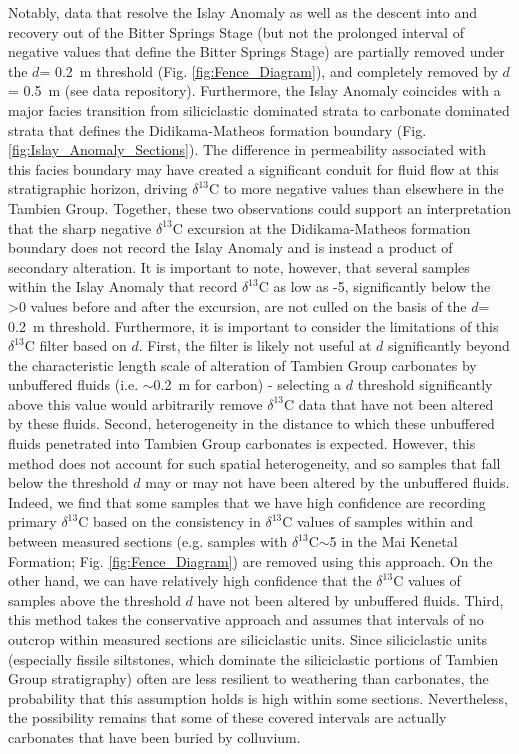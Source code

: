 \documentclass[11pt,letterpaper]{article}
\newcommand{\dC}{$\delta^{13}$C\xspace}
\newcommand{\permil}{\textperthousand\xspace}
\newcommand{\dsil}{$d$\xspace}
\begin{document}
Notably, data that resolve the Islay Anomaly as well as the descent into and recovery out of the Bitter Springs Stage (but not the prolonged interval of negative values that define the Bitter Springs Stage) are partially removed under the \dsil = 0.2~m threshold (Fig. \ref{fig:Fence_Diagram}), and completely removed by \dsil = 0.5~m (see data repository). Furthermore, the Islay Anomaly coincides with a major facies transition from siliciclastic dominated strata to carbonate dominated strata that defines the Didikama-Matheos formation boundary (Fig. \ref{fig:Islay_Anomaly_Sections}). The difference in permeability associated with this facies boundary may have created a significant conduit for fluid flow at this stratigraphic horizon, driving \dC to more negative values than elsewhere in the Tambien Group. Together, these two observations could support an interpretation that the sharp negative \dC excursion at the Didikama-Matheos formation boundary does not record the Islay Anomaly and is instead a product of secondary alteration. It is important to note, however, that several samples within the Islay Anomaly that record \dC as low as -5\permil, significantly below the \textgreater0\permil values before and after the excursion, are not culled on the basis of the \dsil = 0.2~m threshold. Furthermore, it is important to consider the limitations of this \dC filter based on \dsil. First, the filter is likely not useful at \dsil significantly beyond the characteristic length scale of alteration of Tambien Group carbonates by unbuffered fluids (i.e. $\sim$0.2~m for carbon) - selecting a \dsil threshold significantly above this value would arbitrarily remove \dC data that have not been altered by these fluids. Second, heterogeneity in the distance to which these unbuffered fluids penetrated into Tambien Group carbonates is expected. However, this method does not account for such spatial heterogeneity, and so samples that fall below the threshold \dsil may or may not have been altered by the unbuffered fluids. Indeed, we find that some samples that we have high confidence are recording primary \dC based on the consistency in \dC values of samples within and between measured sections (e.g. samples with \dC $\sim$5\permil in the Mai Kenetal Formation; Fig. \ref{fig:Fence_Diagram}) are removed using this approach. On the other hand, we can have relatively high confidence that the \dC values of samples above the threshold \dsil have not been altered by unbuffered fluids. Third, this method takes the conservative approach and assumes that intervals of no outcrop within measured sections are siliciclastic units. Since siliciclastic units (especially fissile siltstones, which dominate the siliciclastic portions of Tambien Group stratigraphy) often are less resilient to weathering than carbonates, the probability that this assumption holds is high within some sections. Nevertheless, the possibility remains that some of these covered intervals are actually carbonates that have been buried by colluvium.
\end{document}
